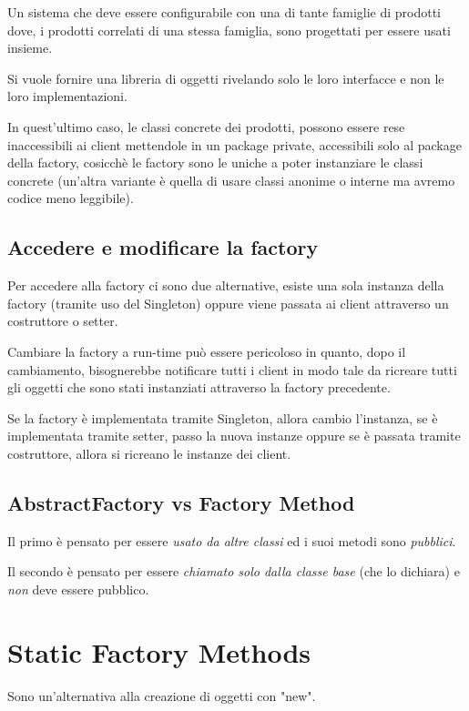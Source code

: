 Un sistema che deve essere configurabile con una di tante famiglie di prodotti dove, i prodotti correlati di una stessa famiglia, sono progettati per essere usati 
insieme.

Si vuole fornire una libreria di oggetti rivelando solo le loro interfacce e non le loro implementazioni.

In quest'ultimo caso, le classi concrete dei prodotti, possono essere rese inaccessibili ai client mettendole in un package private, accessibili solo al package della
factory, cosicchè le factory sono le uniche a poter instanziare le classi concrete (un'altra variante è quella di usare classi anonime o interne ma avremo codice meno
leggibile).

\subsection{Accedere e modificare la factory}

Per accedere alla factory ci sono due alternative, esiste una sola instanza della factory (tramite uso del Singleton) oppure viene passata ai client attraverso un 
costruttore o setter.

Cambiare la factory a run-time può essere pericoloso in quanto, dopo il cambiamento, bisognerebbe notificare tutti i client in modo tale da ricreare tutti gli oggetti 
che sono stati instanziati attraverso la factory precedente.

Se la factory è implementata tramite Singleton, allora cambio l'instanza, se è implementata tramite setter, passo la nuova instanze oppure se è passata tramite 
costruttore, allora si ricreano le instanze dei client.

\subsection{AbstractFactory vs Factory Method}

Il primo è pensato per essere \textit{usato da altre classi} ed i suoi metodi sono \textit{pubblici}.

Il secondo è pensato per essere \textit{chiamato solo dalla classe base} (che lo dichiara) e \textit{non} deve essere pubblico.

\section{Static Factory Methods}

Sono un'alternativa alla creazione di oggetti con "new".

